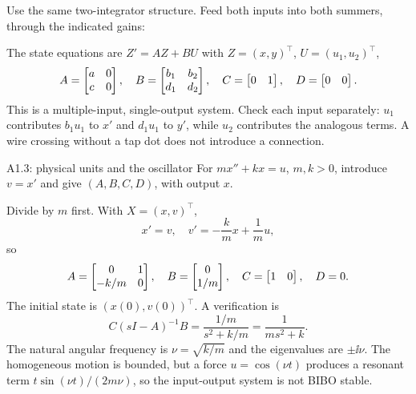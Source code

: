 \begin{answer}
Use the same two-integrator structure. Feed both inputs into both summers, through the indicated gains:
\begin{center}
\end{center}
The state equations are $Z'=AZ+BU$ with $Z=(x,y)^{\top}$, $U=(u_1,u_2)^{\top}$,
\[A=\begin{bmatrix}a&0\\c&0\end{bmatrix},\quad B=\begin{bmatrix}b_1&b_2\\d_1&d_2\end{bmatrix},\quad C=\begin{bmatrix}0&1\end{bmatrix},\quad D=\begin{bmatrix}0&0\end{bmatrix}.\]
This is a multiple-input, single-output system. Check each input separately: $u_1$ contributes $b_1u_1$ to $x'$ and $d_1u_1$ to $y'$, while $u_2$ contributes the analogous terms. A wire crossing without a tap dot does not introduce a connection.
\end{answer}
\begin{question}{A1.3: physical units and the oscillator}
For $mx''+kx=u$, $m,k>0$, introduce $v=x'$ and give $(A,B,C,D)$, with output $x$.
\end{question}
\begin{answer}
Divide by $m$ first. With $X=(x,v)^{\top}$,
\[x'=v,\quad v'=-\frac{k}{m}x+\frac1m u,\]
so
\[A=\begin{bmatrix}0&1\\-k/m&0\end{bmatrix},\quad B=\begin{bmatrix}0\\1/m\end{bmatrix},\quad C=\begin{bmatrix}1&0\end{bmatrix},\quad D=0.\]
The initial state is $(x(0),v(0))^{\top}$. A verification is
\[C(sI-A)^{-1}B=\frac{1/m}{s^2+k/m}=\frac1{ms^2+k}.\]
The natural angular frequency is $\nu=\sqrt{k/m}$ and the eigenvalues are $\pm\ii\nu$. The homogeneous motion is bounded, but a force $u=\cos(\nu t)$ produces a resonant term $t\sin(\nu t)/(2m\nu)$, so the input-output system is not BIBO stable.
\end{answer}
